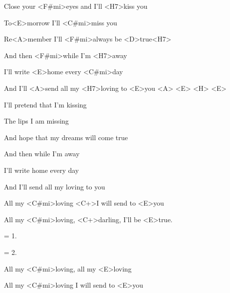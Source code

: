 

\zs
Close your <F#mi>eyes and I'll <H7>kiss you

To<E>morrow I'll <C#mi>miss you

Re<A>member I'll <F#mi>always be <D>true<H7>

And then <F#mi>while I'm <H7>away

I'll write <E>home every <C#mi>day

And I'll <A>send all my <H7>loving to <E>you <A> <E> <H> <E>
\ks

\zs
I'll pretend that I'm kissing

The lips I am missing

And hope that my dreams will come true

And then while I'm away

I'll write home every day

And I'll send all my loving to you
\ks

\zr
All my <C#mi>loving <C+>I will send to <E>you

All my <C#mi>loving, <C+>darling, I'll be <E>true.
\kr

\zs
= 1.
\ks

\zs
= 2.
\ks

\zr
All my <C#mi>loving, all my <E>loving

All my <C#mi>loving I will send to <E>you
\kr

\kp





